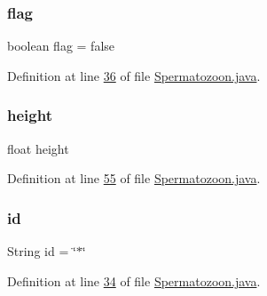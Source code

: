 \hypertarget{classdata_1_1_spermatozoon_ab46c49fb62e0ee61b3865f1e9153fdaa}{}\label{classdata_1_1_spermatozoon_ab46c49fb62e0ee61b3865f1e9153fdaa} 
\subsubsection{\texorpdfstring{flag}{flag}}
{\footnotesize\ttfamily boolean flag = false}



Definition at line \hyperlink{_spermatozoon_8java_source_l00036}{36} of file \hyperlink{_spermatozoon_8java_source}{Spermatozoon.\+java}.

\hypertarget{classdata_1_1_spermatozoon_a48083b65ac9a863566dc3e3fff09a5b4}{}\label{classdata_1_1_spermatozoon_a48083b65ac9a863566dc3e3fff09a5b4} 
\subsubsection{\texorpdfstring{height}{height}}
{\footnotesize\ttfamily float height}



Definition at line \hyperlink{_spermatozoon_8java_source_l00055}{55} of file \hyperlink{_spermatozoon_8java_source}{Spermatozoon.\+java}.

\hypertarget{classdata_1_1_spermatozoon_a76010eef1edc0406cc2375c25d2a433d}{}\label{classdata_1_1_spermatozoon_a76010eef1edc0406cc2375c25d2a433d} 
\subsubsection{\texorpdfstring{id}{id}}
{\footnotesize\ttfamily String id = \char`\"{}$\ast$\char`\"{}}



Definition at line \hyperlink{_spermatozoon_8java_source_l00034}{34} of file \hyperlink{_spermatozoon_8java_source}{Spermatozoon.\+java}.

\hypertarget{classdata_1_1_spermatozoon_a204be1963f7e7f07114c1d42360376be}{}\label{classdata_1_1_spermatozoon_a204be1963f7e7f07114c1d42360376be} 
